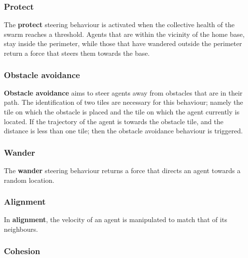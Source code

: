 

\subsubsection*{Protect}
The \textbf{protect} steering behaviour is activated when the collective health of the swarm reaches a threshold.
Agents that are within the vicinity of the home base, stay inside the perimeter, 
while those that have wandered outside the perimeter return a force that steers them towards the base.



\subsubsection*{Obstacle avoidance}
\textbf{Obstacle avoidance} aims to steer agents away from obstacles that are in their path.
The identification of two tiles are necessary for this behaviour; 
namely the tile on which the obstacle is placed and the tile on which the agent currently is located.
If the trajectory of the agent is towards the obstacle tile, and the distance is less than one tile;
then the obstacle avoidance behaviour is triggered.




\subsubsection*{Wander}
The \textbf{wander} steering behaviour returns a force that directs an agent towards a random location.




\subsubsection*{Alignment}


In \textbf{alignment}, the velocity of an agent is manipulated to match that of its neighbours.




\subsubsection*{Cohesion}


